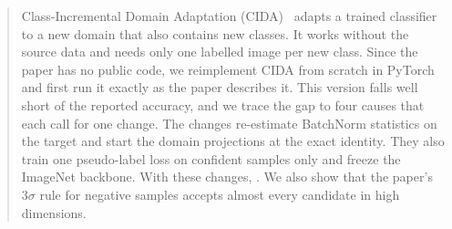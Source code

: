\begin{abstract}
Class-Incremental Domain Adaptation (CIDA)~\citep{kundu2020cida} adapts a trained classifier to a new domain that also contains new classes.
It works without the source data and needs only one labelled image per new class.
Since the paper has no public code, we reimplement CIDA from scratch in PyTorch and first run it exactly as the paper describes it.
This version falls well short of the reported accuracy, and we trace the gap to four causes that each call for one change.
The changes re-estimate BatchNorm statistics on the target and start the domain projections at the exact identity.
They also train one pseudo-label loss on confident samples only and freeze the ImageNet backbone.
With these changes, .
We also show that the paper's $3\sigma$ rule for negative samples accepts almost every candidate in high dimensions.
\end{abstract}
